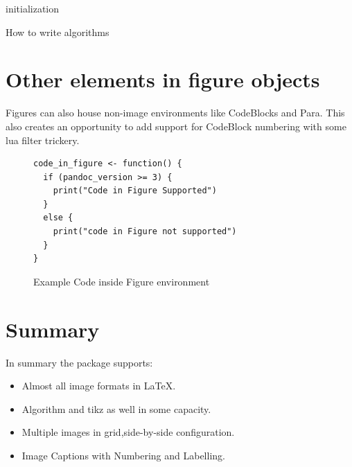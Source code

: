 \begin{algorithm}[htbp]
\SetAlgoLined
{}
initialization\;
\caption{How to write algorithms}
  \label{alg:how}
\end{algorithm}

\section{Other elements in figure objects}
Figures can also house non-image environments like CodeBlocks and Para. This 
also creates an opportunity to add support for CodeBlock numbering with some
lua filter trickery.
\begin{figure}[htbp]
\begin{center}
\begin{verbatim}
code_in_figure <- function() {
  if (pandoc_version >= 3) {
    print("Code in Figure Supported")
  }
  else {
    print("code in Figure not supported")
  }
}
\end{verbatim}
\caption{ Example Code inside Figure environment}
\label{code:example}
\end{center}
\end{figure}
\section{Summary}

In summary the  package supports:
\begin{itemize}
\item Almost all image formats in LaTeX.
\item Algorithm and tikz as well in some capacity.
\item Multiple images in grid,side-by-side configuration.
\item Image Captions with Numbering and Labelling.
\end{itemize}




